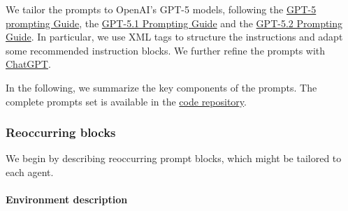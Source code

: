 \documentclass[submission, Phys]{SciPost}
\begin{document}
\label{app:prompts}

We tailor the prompts to OpenAI's GPT-5 models, following the \href{https://cookbook.openai.com/examples/gpt-5/gpt-5_prompting_guide}{GPT-5 prompting Guide}, the \href{https://cookbook.openai.com/examples/gpt-5/gpt-5-1_prompting_guide}{GPT-5.1 Prompting Guide} and the \href{https://cookbook.openai.com/examples/gpt-5/gpt-5-2_prompting_guide}{GPT-5.2 Prompting Guide}. In particular, we use XML tags to structure the instructions and adapt some recommended instruction blocks. We further refine the prompts with \href{https://chatgpt.com/}{ChatGPT}.

In the following, we summarize the key components of the prompts. The complete prompts set is available in the \href{https://github.com/heidelberg-hepml/MadAgents/tree/main/supplementary/prompts}{code repository}.

\subsubsection*{Reoccurring blocks}

We begin by describing reoccurring prompt blocks, which might be tailored to each agent.

\paragraph{Environment description}
\end{document}
